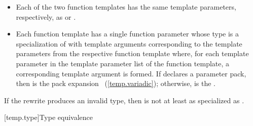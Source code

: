 \begin{itemize}
\item
Each of the two function templates has the same template parameters,
respectively, as  or .
\item
Each function template has a single function parameter
whose type is a specialization of 
with template arguments corresponding to the template parameters
from the respective function template where,
for each template parameter 
in the template parameter list of the function template,
a corresponding template argument  is formed.
If  declares a parameter pack,
then  is the pack expansion ~(\ref{temp.variadic});
otherwise,  is the  .
\end{itemize}
If the rewrite produces an invalid type,
then  is not at least as specialized as .

[temp.type]{Type equivalence}

